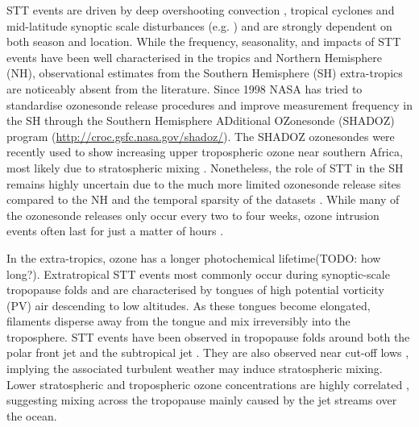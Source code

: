 \documentclass{article}
\begin{document}
    STT events are driven by deep overshooting convection \citep{Frey2015}, tropical cyclones \citep{Das2016} and mid-latitude synoptic scale disturbances (e.g. \citet{Stohl2003,Mihalikova2012}) and 
    are strongly dependent on both season and location. 
    While the frequency, seasonality, and impacts of STT events have been well characterised in the tropics and Northern Hemisphere (NH), observational estimates from the Southern Hemisphere (SH) extra-tropics are noticeably absent from the literature. 
    Since 1998 NASA has tried to standardise ozonesonde release procedures and improve measurement frequency in the SH through the Southern Hemisphere ADditional OZonesonde (SHADOZ) program (\url{http://croc.gsfc.nasa.gov/shadoz/}).
    The SHADOZ ozonesondes were recently used to show increasing upper tropospheric ozone near southern Africa, most likely due to stratospheric mixing \citep{Liu2015, Thompson2014}. 
    Nonetheless, the role of STT in the SH remains highly uncertain due to the much more limited ozonesonde release sites compared to the NH and the temporal sparsity of the datasets  \citep{Liu2015, Thompson2014, Mze2010}. 
    While many of the ozonesonde releases only occur every two to four weeks, ozone intrusion events often last for just a matter of hours \citep{Tang2012}.
    
    In the extra-tropics, ozone has a longer photochemical lifetime(TODO: how long?).
    Extratropical STT events most commonly occur during synoptic-scale tropopause folds \citep{Sprenger2003, Tang2012} and are characterised by tongues of high potential vorticity (PV) air descending to low altitudes.
    As these tongues become elongated, filaments disperse away from the tongue and mix irreversibly into the troposphere.
    STT events have been observed in tropopause folds around both the polar front jet \citep{Vaughan1994, Beekmann1997} and the subtropical jet \citep{Baray2000}.
    They are also observed near cut-off lows \citep{Price1993, Wirth1995}, implying the associated turbulent weather may induce stratospheric mixing.
    Lower stratospheric and tropospheric ozone concentrations are highly correlated \citep{Terao2008}, suggesting mixing across the tropopause mainly caused by the jet streams over the ocean.
    
  
\end{document}
